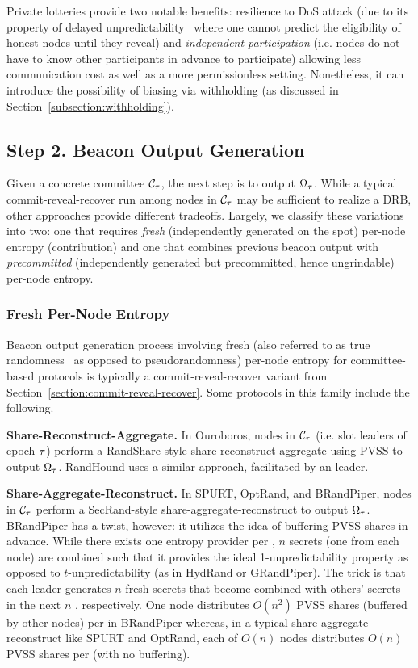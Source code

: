 Private lotteries provide two notable benefits: resilience to DoS attack (due to its property of delayed unpredictability~\cite{azouvi2018winning} where one cannot predict the eligibility of honest nodes until they reveal) and \textit{independent participation} (i.e. nodes do not have to know other participants in advance to participate) allowing less communication cost as well as a more permissionless setting. Nonetheless, it can introduce the possibility of biasing via withholding (as discussed in Section~\ref{subsection:withholding}).

\subsection{Step 2. Beacon Output Generation}
\label{subsection:beacon-output-generation}
Given a concrete committee $\mathcal{C}_\tau$, the next step is to output $\Omega_\tau$. While a typical commit-reveal-recover run among nodes in $\mathcal{C}_\tau$ may be sufficient to realize a DRB, other approaches provide different tradeoffs. Largely, we classify these variations into two: one that requires \textit{fresh} (independently generated on the spot) per-node entropy (contribution) and one that combines previous beacon output with \textit{precommitted} (independently generated but precommitted, hence ungrindable) per-node entropy.

\subsubsection{Fresh Per-Node Entropy}
\label{subsubsection:fresh}
Beacon output generation process involving fresh (also referred to as true randomness~\cite{cascudomt, das2021spurt} as opposed to pseudorandomness) per-node entropy for committee-based protocols is typically a commit-reveal-recover variant from Section~\ref{section:commit-reveal-recover}. Some protocols in this family include the following.

\noindent\textbf{Share-Reconstruct-Aggregate.} In Ouroboros, nodes in $\mathcal{C}_\tau$ (i.e. slot leaders of epoch $\tau$) perform a RandShare-style share-reconstruct-aggregate using PVSS to output $\Omega_\tau$. RandHound uses a similar approach, facilitated by an \epoch leader.

\noindent\textbf{Share-Aggregate-Reconstruct.} In SPURT, OptRand, and BRandPiper, nodes in $\mathcal{C}_\tau$ perform a SecRand-style share-aggregate-reconstruct to output $\Omega_\tau$. BRandPiper has a twist, however: it utilizes the idea of buffering PVSS shares in advance. While there exists one entropy provider per \epoch, $n$ secrets (one from each node) are combined such that it provides the ideal 1-unpredictability property as opposed to $t$-unpredictability (as in HydRand or GRandPiper). The trick is that each \epoch leader generates $n$ fresh secrets that become combined with others' secrets in the next $n$ \epochs, respectively. One node distributes $O(n^2)$ PVSS shares (buffered by other nodes) per \epoch in BRandPiper whereas, in a typical share-aggregate-reconstruct like SPURT and OptRand, each of $O(n)$ nodes distributes $O(n)$ PVSS shares per \epoch (with no buffering).

